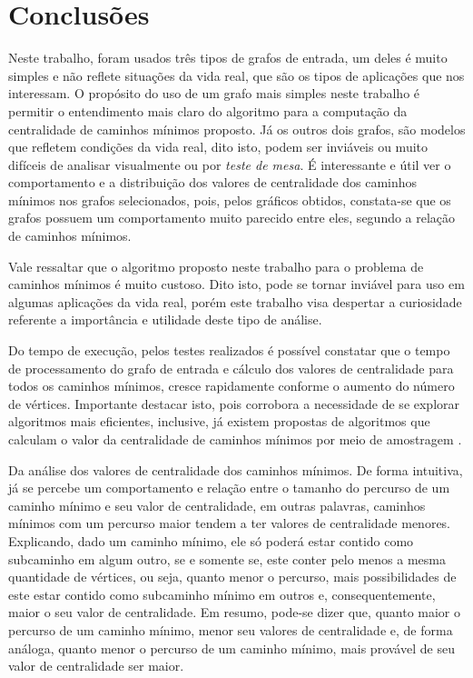 \chapter{Conclusões}
Neste trabalho, foram usados três tipos de grafos de entrada, um deles é muito simples e não reflete situações da vida real, que são os tipos de aplicações que nos interessam. O propósito do uso de um grafo mais simples neste trabalho é permitir o entendimento mais claro do algoritmo para a computação da centralidade de caminhos mínimos proposto. Já os outros dois grafos, são modelos que refletem condições da vida real, dito isto, podem ser inviáveis ou muito difíceis de analisar visualmente ou por \emph{teste de mesa}. É interessante e útil ver o comportamento e a distribuição dos valores de centralidade dos caminhos mínimos nos grafos selecionados, pois, pelos gráficos obtidos, constata-se que os grafos possuem um comportamento muito parecido entre eles, segundo a relação de caminhos mínimos.

Vale ressaltar que o algoritmo proposto neste trabalho para o problema de caminhos mínimos é muito custoso. Dito isto, pode se tornar inviável para uso em algumas aplicações da vida real, porém este trabalho visa despertar a curiosidade referente a importância e utilidade deste tipo de análise.

Do tempo de execução, pelos testes realizados é possível constatar que o tempo de processamento do grafo de entrada e cálculo dos valores de centralidade para todos os caminhos mínimos, cresce rapidamente conforme o aumento do número de vértices. Importante destacar isto, pois corrobora a necessidade de se explorar algoritmos mais eficientes, inclusive, já existem propostas de algoritmos que calculam o valor da centralidade de caminhos mínimos por meio de amostragem \cite{alane2021}.

Da análise dos valores de centralidade dos caminhos mínimos. De forma intuitiva, já se percebe um comportamento e relação entre o tamanho do percurso de um caminho mínimo e seu valor de centralidade, em outras palavras, caminhos mínimos com um percurso maior tendem a ter valores de centralidade menores. Explicando, dado um caminho mínimo, ele só poderá estar contido como subcaminho em algum outro, se e somente se, este conter pelo menos a mesma quantidade de vértices, ou seja, quanto menor o percurso, mais possibilidades de este estar contido como subcaminho mínimo em outros e, consequentemente, maior o seu valor de centralidade. Em resumo, pode-se dizer que, quanto maior o percurso de um caminho mínimo, menor seu valores de centralidade e, de forma análoga, quanto menor o percurso de um caminho mínimo, mais provável de seu valor de centralidade ser maior.

